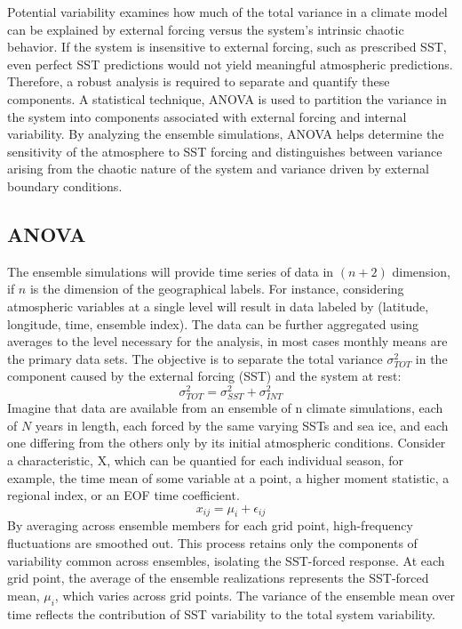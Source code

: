 Potential variability examines how much of the total variance in a climate model can be explained by external forcing versus the system's intrinsic chaotic behavior. If the system is insensitive to external forcing, such as prescribed SST, even perfect SST predictions would not yield meaningful atmospheric predictions. Therefore, a robust analysis is required to separate and quantify these components. A statistical technique, ANOVA is used to partition the variance in the system into components associated with external forcing and internal variability. By analyzing the ensemble simulations, ANOVA helps determine the sensitivity of the atmosphere to SST forcing and distinguishes between variance arising from the chaotic nature of the system and variance driven by external boundary conditions.
\subsection{ANOVA} The ensemble simulations will provide time series of data in $(n+2)$ dimension, if $n$ is
the dimension of the geographical labels. For instance, considering atmospheric variables at a single level will result in data labeled by (latitude, longitude, time, ensemble index). The data can be further aggregated using averages to the level necessary for the analysis, in most cases monthly means are the primary data sets. The objective is to separate the total variance $\sigma^2_{TOT}$ in the component caused by the external forcing (SST) and the system at rest:
$$\sigma_{TOT}^2=\sigma^2_{SST}+\sigma^2_{INT}$$
Imagine that data are available from an ensemble of n climate
simulations, each of $N$ years in length, each forced by the same
varying SSTs and sea ice, and each one differing from the others only
by its initial atmospheric conditions. Consider a characteristic, X, which can be quantied for each individual season, for example, the time mean of some variable at a point, a higher moment statistic, a regional index, or an EOF time coefficient.
$$x_{ij}=\mu_i+\epsilon_{ij}$$
By averaging across ensemble members for each grid point, high-frequency fluctuations are smoothed out. This process retains only the components of variability common across ensembles, isolating the SST-forced response. At each grid point, the average of the ensemble realizations represents the SST-forced mean, $\mu_i$, which varies across grid points. The variance of the ensemble mean over time reflects the contribution of SST variability to the total system variability.


